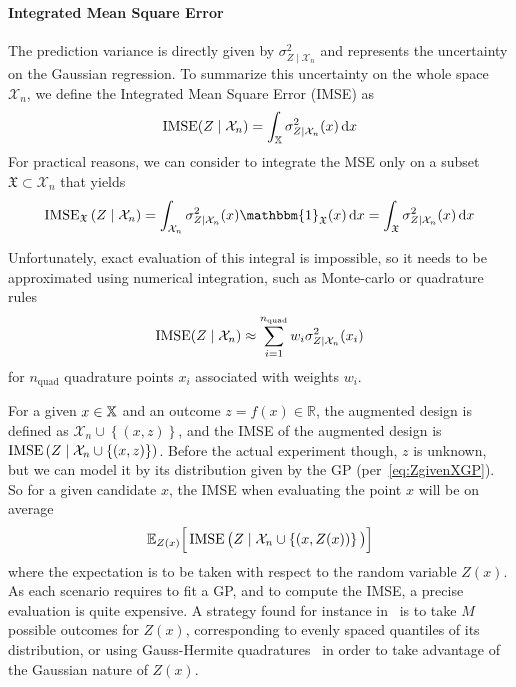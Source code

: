 \documentclass[../../Main_ManuscritThese.tex]{subfiles}
\begin{document}
\paragraph{Integrated Mean Square Error}
The prediction variance is directly given by $\sigma^2_{Z\mid \mathcal{X}_n}$ and represents the uncertainty on the Gaussian regression. To summarize this uncertainty on the whole space $\mathcal{X}_n$, we define the Integrated Mean Square Error (IMSE)\cite{sacks_designs_1989}
 as
\begin{equation}
  \operatorname{\mathrm{IMSE}}(Z \mid \mathcal{X}_n) = \int_{\mathbb{X}} \sigma_{Z\mid\mathcal{X}_n}^2(x)\,\mathrm{d}x
\end{equation}
For practical reasons, we can consider to integrate the MSE only on a subset $\mathfrak{X}\subset \mathcal{X}_n$ that yields
\begin{equation}
  \IMSE_{\mathfrak{X}}\left(Z \mid \mathcal{X}_n \right) = \int_{\mathcal{X}_n} \sigma^2_{Z\mid \mathcal{X}_n}(x)  \mathbbm{1}_{\mathfrak{X}}(x)\,\mathrm{d}x = \int_{\mathfrak{X}} \sigma^2_{Z\mid \mathcal{X}_n}(x)\,\mathrm{d}x
\end{equation}

Unfortunately, exact evaluation of this integral is impossible, so it needs to be approximated using numerical integration, such as Monte-carlo or quadrature rules
\begin{equation}
  \operatorname{\mathrm{IMSE}}(Z\mid \mathcal{X}_n) \approx \sum_{i=1}^{n_{\mathrm{quad}}} w_i \sigma^2_{Z\mid\mathcal{X}_n}(x_i)
\end{equation}
for $n_{\mathrm{quad}}$ quadrature points $x_i$ associated with weights $w_i$.


For a given $x\in \mathbb{X}$ and an outcome $z=f(x)\in \mathbb{R}$, the augmented design is defined as $\mathcal{X}_n \cup \left\{(x, z)\right\}$, and the IMSE of the augmented design is $\operatorname{\mathrm{IMSE}}\left(Z \mid \mathcal{X}_n \cup \left\{(x, z)\right\} \right)$.
Before the actual experiment though, $z$ is unknown, but we can model it by its distribution given by the GP (per~\cref{eq:ZgivenXGP}). So for a given candidate $x$, the IMSE when evaluating the point $x$ will be on average
\begin{equation}
  \label{eq:IMSE_augmented}
  \mathbb{E}_{Z(x)}\Big[\operatorname{\mathrm{IMSE}}\big(Z \mid \mathcal{X}_n \cup \left\{(x, Z(x))\right\} \big)\Big]
\end{equation}
where the expectation is to be taken with respect to the random variable $Z(x)$. As each scenario requires to fit a GP, and to compute the IMSE, a precise evaluation is quite expensive. A strategy found for instance in~\cite{villemonteix_informational_2006} is to take $M$ possible outcomes for $Z(x)$, corresponding to evenly spaced quantiles of its distribution, or using Gauss-Hermite quadratures~\cite{bernard_methodes_2019} in order to take advantage of the Gaussian nature of $Z(x)$.
\end{document}
